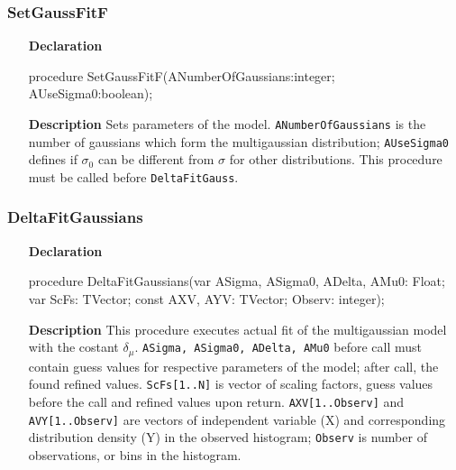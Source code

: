 \documentclass[12pt,a4paper,oneside]{report}
\newcommand{\declarationitem}[1]{\textbf{#1}}
\newcommand{\descriptiontitle}[1]{\textbf{#1}}
\newcommand{\code}[1]{\texttt{#1}}
\begin{document}
\subsubsection{SetGaussFitF}
\label{ugaussf-SetGaussFitF}
\begin{itemize}\item[\declarationitem{Declaration}\hfill]
	\begin{flushleft}
		\begin{ttfamily}
			procedure SetGaussFitF(ANumberOfGaussians:integer; AUseSigma0:boolean);\end{ttfamily}
		
	\end{flushleft}
	\par
	\item[\descriptiontitle{Description}]
	Sets parameters of the model. \code{ANumberOfGaussians} is the number of gaussians which form the multigaussian distribution; \code{AUseSigma0} defines if $\sigma_0$ can be different from $\sigma$ for other distributions. This procedure must be called before \code{DeltaFitGauss}.
	
\end{itemize}
\subsubsection{DeltaFitGaussians}
\label{ugaussf-DeltaFitGaussians}
\begin{itemize}\item[\declarationitem{Declaration}\hfill]
	\begin{flushleft}
		\begin{ttfamily}
			procedure DeltaFitGaussians(var ASigma, ASigma0, ADelta, AMu0: Float; var ScFs: TVector; const AXV, AYV: TVector; Observ: integer);\end{ttfamily}
		
	\end{flushleft}
	\par
	\item[\descriptiontitle{Description}]
	This procedure executes actual fit of the multigaussian model with the costant $\delta_{\mu}$. \code{ASigma, ASigma0, ADelta, AMu0} before call must contain guess values for respective parameters of the model; after call, the found refined values. \code{ScFs[1..N]} is vector of scaling factors, guess values before the call and refined values upon return. \code{AXV[1..Observ]} and \code{AVY[1..Observ]} are vectors of independent variable (X) and corresponding distribution density (Y) in the observed histogram; \code{Observ} is number of observations, or bins in the histogram.
\end{itemize}
\end{document}
